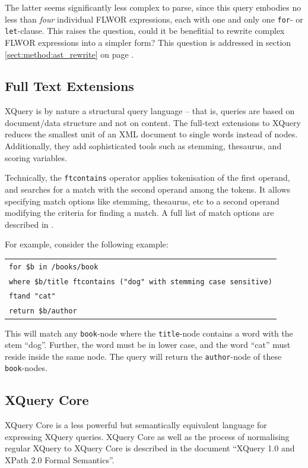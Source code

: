 The latter seems significantly less complex to parse, since this query embodies
no less than \emph{four} individual FLWOR expressions, each with one and only
one \texttt{for}- or \texttt{let}-clause. This raises the question, could it be
benefitial to rewrite complex FLWOR expressions into a simpler form? This
question is addressed in section \ref{sect:method:ast_rewrite} on page
\pageref{sect:method:ast_rewrite}.

\subsection{Full Text Extensions}
\label{sect:theory:xquery:fulltext_ext}
XQuery is by nature a structural query language -- that is, queries are based on
document/data structure and not on content. The full-text extensions to XQuery
reduces the smallest unit of an XML document to single words instead of nodes.
Additionally, they add sophisticated tools such as stemming, thesaurus, and
scoring variables.

Technically, the \verb!ftcontains! operator applies tokenisation of the first
operand, and searches for a match with the second operand among the tokens. It
allows specifying match options like stemming, thesaurus, etc to a second
operand modifying the criteria for finding a match. A full list of match
options are described in \cite{w3c01}.

For example, consider the following example:
\begin{center}
\begin{tabular}{l}
\texttt{for \$b in /books/book} \\
\texttt{where \$b/title ftcontains ("dog" with stemming case sensitive)} \\ \quad\quad\quad
\texttt{ftand "cat"} \\
\texttt{return \$b/author}
\end{tabular}
\end{center}
This will match any \texttt{book}-node where the \texttt{title}-node contains a word with the stem ``dog''.
Further, the word must be in lower case, and the word ``cat'' must reside inside the same node. The query will
return the \texttt{author}-node of these \texttt{book}-nodes. 

\subsection{XQuery Core}
\label{sect:theory:xquery:XQcore}
XQuery Core is a less powerful but semantically equivalent language for expressing
XQuery queries. XQuery Core as well as the process of normalising regular
XQuery to XQuery Core is described in the document ``XQuery 1.0 and XPath 2.0
Formal Semantics''\cite{xquery_semantics}.

